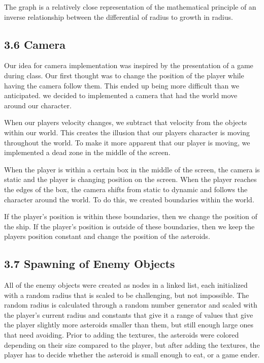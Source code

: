 \documentclass[12pt]{report}
\begin{document}
\medskip \noindent The graph is a relatively close representation of the mathematical principle of an inverse relationship between the differential of radius to growth in radius.

\newpage
\subsection*{3.6 Camera}
Our idea for camera implementation was inspired by the presentation of a game during class. Our first thought was to change the position of the player while having the camera follow them. This ended up being more difficult than we anticipated. we decided to implemented a camera that had the world move around our character. \bigskip

When our players velocity changes, we subtract that velocity from the objects within our world. This creates the illusion that our players character is moving throughout the world. To make it more apparent that our player is moving, we implemented a dead zone in the middle of the screen. \bigskip

When the player is within a certain box in the middle of the screen, the camera is static and the player is changing position on the screen. When the player reaches the edges of the box, the camera shifts from static to dynamic and follows the character around the world. To do this, we created boundaries within the world. \bigskip

If the player's position is within these boundaries, then we change the position of the ship. If the player's position is outside of these boundaries, then we keep the players position constant and change the position of the asteroids.

\newpage
\subsection*{3.7 Spawning of Enemy Objects}
All of the enemy objects were created as nodes in a linked list, each initialized with a random radius that is scaled to be challenging, but not impossible. The random radius is calculated through a random number generator and scaled with the player's current radius and constants that give it a range of values that give the player slightly more asteroids smaller than them, but still enough large ones that need avoiding. Prior to adding the textures, the asteroids were colored depending on their size compared to the player, but after adding the textures, the player has to decide whether the asteroid is small enough to eat, or a game ender. \bigskip
\end{document}
